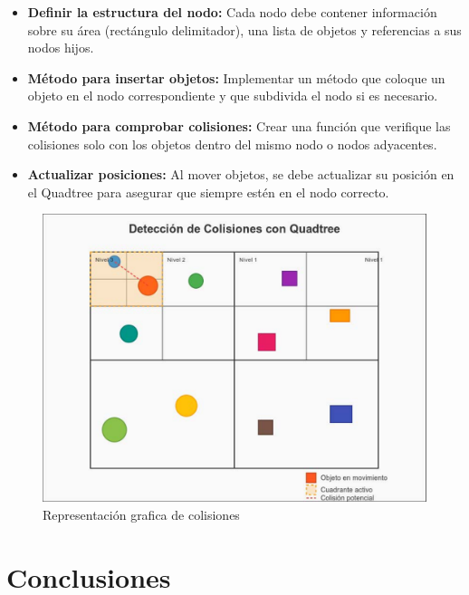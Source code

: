 \documentclass[9pt,a4paper,twoside]{rho-class/rho}
\begin{document}
        \begin{itemize}
            \item \textbf{Definir la estructura del nodo:} Cada nodo debe contener información sobre su área (rectángulo delimitador), una lista de objetos y referencias a sus nodos hijos.
            
            \item \textbf{Método para insertar objetos:} Implementar un método que coloque un objeto en el nodo correspondiente y que subdivida el nodo si es necesario.
            
            \item \textbf{Método para comprobar colisiones:} Crear una función que verifique las colisiones solo con los objetos dentro del mismo nodo o nodos adyacentes.
            
            \item \textbf{Actualizar posiciones:} Al mover objetos, se debe actualizar su posición en el Quadtree para asegurar que siempre estén en el nodo correcto.
        \end{itemize}
        \begin{figure}[h]
            \centering
            \includegraphics[width=\linewidth]{figures/quadtree-collision.pdf}
            \caption{Representación grafica de colisiones} 
            \label{fig:colision_figure}
        \end{figure}
        
    \section{Conclusiones}
\end{document}
